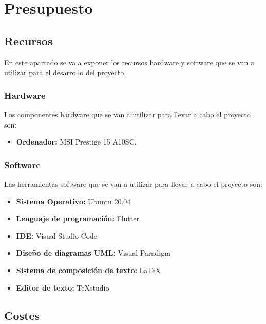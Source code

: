\newpage

\section{Presupuesto}

\subsection{Recursos}

En este apartado se va a exponer los recursos hardware y software que se van a utilizar para el desarrollo del proyecto. 

\begin{adjustwidth}{2em}{0pt} %
\subsubsection{Hardware}

Los componentes hardware que se van a utilizar para llevar a cabo el proyecto son: 

\begin{itemize}
	\item \textbf{Ordenador:} MSI Prestige 15 A10SC.
\end{itemize}

\subsubsection{Software}

Las herramientas software que se van a utilizar para llevar a cabo el proyecto son: 

\begin{itemize}
	\item \textbf{Sistema Operativo:} Ubuntu 20.04
	\item \textbf{Lenguaje de programación:} Flutter
	\item \textbf{IDE:} Visual Studio Code
	\item \textbf{Diseño de diagramas UML:} Visual Paradigm
	\item \textbf{Sistema de composición de texto:} LaTeX
	\item \textbf{Editor de texto:} TeXstudio
\end{itemize}
\end{adjustwidth} 

\subsection{Costes}

